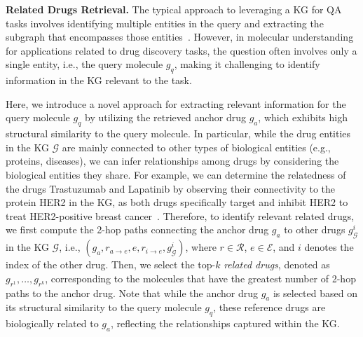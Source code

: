 \noindent \textbf{Related Drugs Retrieval.}
The typical approach to leveraging a KG for QA tasks involves identifying multiple entities in the query and extracting the subgraph that encompasses those entities~\cite{baek2023knowledge,wen2023mindmap}.
However, in molecular understanding for applications related to drug discovery tasks, the question often involves only a single entity, i.e., the query molecule $g_q$, making it challenging to identify information in the KG relevant to the task. 

Here, we introduce a novel approach for extracting relevant information for the query molecule $g_q$ by utilizing the retrieved anchor drug $g_a$, which exhibits high structural similarity to the query molecule.
In particular, while the drug entities in the KG $\mathcal{G}$ are mainly connected to other types of biological entities (e.g., proteins, diseases), we can infer relationships among drugs by considering the biological entities they share. %
For example, we can determine the relatedness of the drugs Trastuzumab and Lapatinib by observing their connectivity to the protein HER2 in the KG, as both drugs specifically target and inhibit HER2 to treat HER2-positive breast cancer~\cite{de2014lapatinib}.
Therefore, to identify relevant related drugs, we first compute the 2-hop paths connecting the anchor drug $g_{a}$ to other drugs $g_{\mathcal{G}}^{i}$ in the KG $\mathcal{G}$, i.e., $(g_{a}, r_{a \rightarrow e}, e, r_{i \rightarrow e}, g_{\mathcal{G}}^{i})$, where $r \in \mathcal{R}$, $e \in \mathcal{E}$, and $i$ denotes the index of the other drug.
Then, we select the top-$k$ \emph{related drugs}, denoted as $g_{r^{1}}, \ldots, g_{r^{k}}$, corresponding to the molecules that have the greatest number of 2-hop paths to the anchor drug.
Note that while the anchor drug $g_{a}$ is selected based on its structural similarity to the query molecule $g_{q}$, these reference drugs are biologically related to $g_{a}$, reflecting the relationships captured within the KG.


